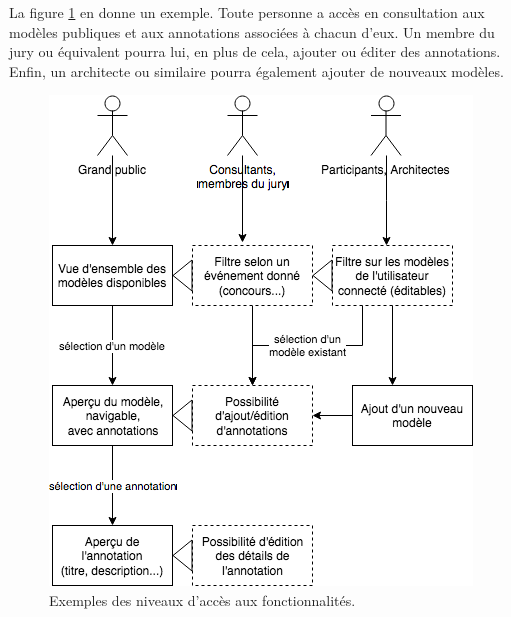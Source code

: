 La figure \ref{fig:use-cases} en donne un exemple. Toute personne a accès en consultation aux modèles publiques et aux annotations associées à chacun d'eux. Un membre du jury ou équivalent pourra lui, en plus de cela, ajouter ou éditer des annotations. Enfin, un architecte ou similaire pourra également ajouter de nouveaux modèles.

\begin{figure}[ht]
    \centering
    \includegraphics[width=0.6\linewidth]{Figures/use-cases.png}
    \caption{Exemples des niveaux d'accès aux fonctionnalités.}
    \label{fig:use-cases}
\end{figure}






